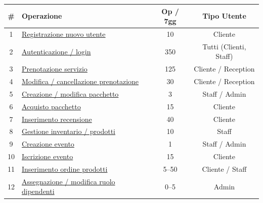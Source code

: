 \documentclass[a4paper,12pt]{report}
\begin{document}
\begin{table}[H]
	\centering
	\small
	\renewcommand{\arraystretch}{1.12}
	\begin{tabularx}{\textwidth}{|c|>{\raggedright\arraybackslash}X|c|c|}
		\hline
		\rowcolor{gray!20}
		\textbf{\#} & \textbf{Operazione}                                                    & \textbf{Op / 7gg} & \textbf{Tipo Utente}   \\
		\hline
		1           & \hyperref[op1]{Registrazione nuovo utente}                             & 10             & Cliente                \\
		\hline
		2           & \hyperref[op2]{Autenticazione / login}                                 & 350          & Tutti (Clienti, Staff) \\
		\hline
		3           & \hyperref[op3]{Prenotazione servizio}                                  & 125           & Cliente / Reception    \\
		\hline
		4           & \hyperref[op4]{Modifica / cancellazione prenotazione}                  & 30            & Cliente / Reception    \\
		\hline
		5           & \hyperref[op5]{Creazione / modifica pacchetto}                         & 3              & Staff / Admin          \\
		\hline
		6           & \hyperref[op6]{Acquisto pacchetto}                                     & 15             & Cliente                \\
		\hline
		7           & \hyperref[op7]{Inserimento recensione}                                 & 40            & Cliente                \\
		\hline
		8           & \hyperref[op8]{Gestione inventario / prodotti}                         & 10             & Staff                  \\
		\hline
		9           & \hyperref[op9]{Creazione evento}                                       & 1              & Staff / Admin          \\
		\hline
		10          & \hyperref[op10]{Iscrizione evento}                                     & 15             & Cliente                \\
		\hline
		11          & \hyperref[op11]{Inserimento ordine prodotti}                           & 5--50             & Cliente / Staff        \\
		\hline
		12          & \hyperref[op12]{Assegnazione / modifica ruolo dipendenti}              & 0--5              & Admin                  \\

\end{tabularx}
\end{table}
\end{document}
